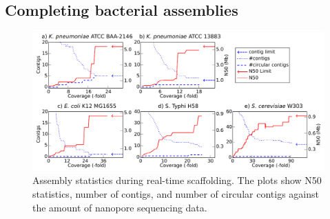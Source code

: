 \subsection{Completing bacterial assemblies} 
\begin{figure}[ht]
\centering
\includegraphics[width=\linewidth]{npscarf/figures/figure2.pdf}
\caption[Assembly statistics during real-time scaffolding]
{Assembly statistics during real-time scaffolding. 
The plots show N50 statistics, number of contigs, and number of
circular contigs against the amount of nanopore sequencing data.}
\label{f:scaffold}
\end{figure}

